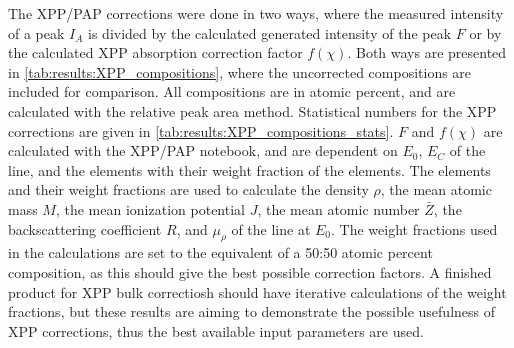 

The XPP/PAP corrections were done in two ways, where the measured intensity of a peak $I_A$ is divided by the calculated generated intensity of the peak $F$ or by the calculated XPP absorption correction factor $f(\chi)$.
Both ways are presented in \cref{tab:results:XPP_compositions}, where the uncorrected compositions are included for comparison.
All compositions are in atomic percent, and are calculated with the relative peak area method.
Statistical numbers for the XPP corrections are given in \cref{tab:results:XPP_compositions_stats}.
$F$ and $f(\chi)$ are calculated with the XPP/PAP notebook, and are dependent on $E_0$, $E_C$ of the line, and the elements with their weight fraction of the elements.
The elements and their weight fractions are used to calculate the density $\rho$, the mean atomic mass $M$, the mean ionization potential $J$, the mean atomic number $\bar{Z}$, the backscattering coefficient $R$, and $\mu_\rho$ of the line at $E_0$.
The weight fractions used in the calculations are set to the equivalent of a 50:50 atomic percent composition, as this should give the best possible correction factors.
A finished product for XPP bulk correctiosh should have iterative calculations of the weight fractions, but these results are aiming to demonstrate the possible usefulness of XPP corrections, thus the best available input parameters are used.




























% 
% 
